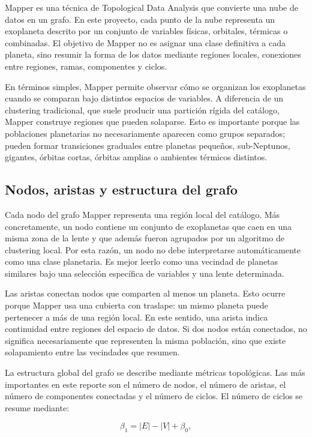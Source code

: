 Mapper es una técnica de Topological Data Analysis que convierte una nube de datos en un grafo. En este proyecto, cada punto de la nube representa un exoplaneta descrito por un conjunto de variables físicas, orbitales, térmicas o combinadas. El objetivo de Mapper no es asignar una clase definitiva a cada planeta, sino resumir la forma de los datos mediante regiones locales, conexiones entre regiones, ramas, componentes y ciclos.

En términos simples, Mapper permite observar cómo se organizan los exoplanetas cuando se comparan bajo distintos espacios de variables. A diferencia de un clustering tradicional, que suele producir una partición rígida del catálogo, Mapper construye regiones que pueden solaparse. Esto es importante porque las poblaciones planetarias no necesariamente aparecen como grupos separados; pueden formar transiciones graduales entre planetas pequeños, sub-Neptunos, gigantes, órbitas cortas, órbitas amplias o ambientes térmicos distintos.

\subsection*{Nodos, aristas y estructura del grafo}

Cada nodo del grafo Mapper representa una región local del catálogo. Más concretamente, un nodo contiene un conjunto de exoplanetas que caen en una misma zona de la lente y que además fueron agrupados por un algoritmo de clustering local. Por esta razón, un nodo no debe interpretarse automáticamente como una clase planetaria. Es mejor leerlo como una vecindad de planetas similares bajo una selección específica de variables y una lente determinada.

Las aristas conectan nodos que comparten al menos un planeta. Esto ocurre porque Mapper usa una cubierta con traslape: un mismo planeta puede pertenecer a más de una región local. En este sentido, una arista indica continuidad entre regiones del espacio de datos. Si dos nodos están conectados, no significa necesariamente que representen la misma población, sino que existe solapamiento entre las vecindades que resumen.

La estructura global del grafo se describe mediante métricas topológicas. Las más importantes en este reporte son el número de nodos, el número de aristas, el número de componentes conectadas y el número de ciclos. El número de ciclos se resume mediante:

\[
\beta_1 = |E| - |V| + \beta_0,
\]

